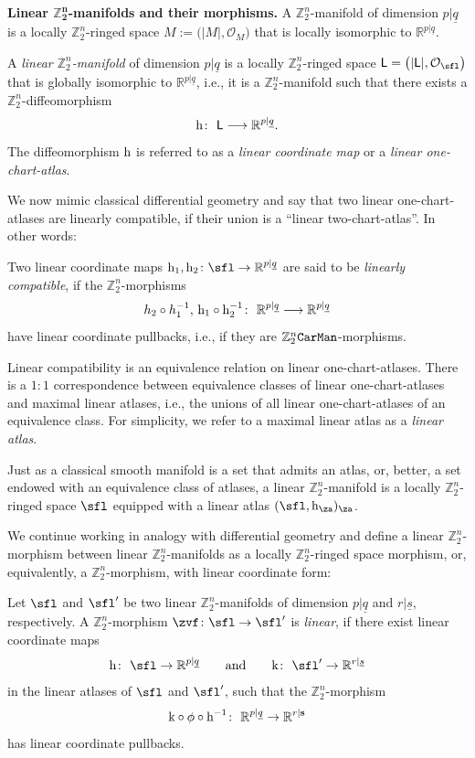 \documentclass[10pt,a4paper]{amsart}
\newcommand{\rmh}{\textnormal{h}}
\newcommand{\rmk}{\textnormal{k}}
\newcommand{\R}{{\mathbb R}}
\newcommand{\Z}{{\mathbb Z}}
\def\ul{\underline}
\def\cO{\mathcal{O}}
\def\ul{\underline}
\newcommand{\0}{\otimes}
\newcommand{\z}{\Z_2^n}
\numberwithin{equation}{section}
\begin{document}
\medskip\noindent
{\bf Linear $\boldsymbol{\z}$-manifolds and their morphisms.} A $\Z_2^n$-manifold of dimension $p|\ul q$ is a locally $\Z^n_2$-ringed space $M := \big(|M|, \cO_M\big)$ that is locally isomorphic to $\R^{p|\ul q}$.
%
\begin{Definition}%
A {\it linear $\Z_2^n$-manifold} of dimension $p|\ul q$ is a locally $\Z_2^n$-ringed space $\textsf{L}=\big(|\textsf{L}|,\cO_\sfl\big)$ that is globally isomorphic to $\R^{p|\ul{q}}$, i.e., it is a $\Z_2^n$-manifold such that there exists a $\Z_2^n$-diffeomorphism
%
\[
\rmh \colon\ \textsf{L} \longrightarrow \R^{p|\ul{q}}.
\]
%
The diffeomorphism $\rmh$ is referred to as a \emph{linear coordinate map} or a \emph{linear one-chart-atlas}.
\end{Definition}
%

We now mimic classical differential geometry and say that two linear one-chart-atlases are linearly compatible, if their union is a ``linear two-chart-atlas''. In other words:

\begin{Definition}
Two linear coordinate maps $\rmh_1, \rmh_2 \colon \sfl \rightarrow \R^{p|\ul{q}}$ are said to be \emph{linearly compa\-tible}, if the $\z$-morphisms
%
\[
h_2\circ h_1^{-1},\,\rmh_1 \circ \rmh^{-1}_2 \colon\ \R^{p|\ul{q}} \longrightarrow \R^{p|\ul{q}}
\]
%
have linear coordinate pullbacks, i.e., if they are $\z\tt CarMan$-morphisms.
\end{Definition}

Linear compatibility is an equivalence relation on linear one-chart-atlases. There is a \mbox{$1:1$} correspondence between equivalence classes of linear one-chart-atlases and maximal linear atla\-ses, i.e., the unions of all linear one-chart-atlases of an equivalence class. For simplicity, we refer to a maximal linear atlas as a \emph{linear atlas}.

Just as a classical smooth manifold is a set that admits an atlas, or, better, a set endowed with an equivalence class of atlases, a linear $\Z_2^n$-manifold is a locally $\z$-ringed space $\sfl$ equipped with a linear atlas $(\sfl,\rmh_\za)_\za$.

We continue working in analogy with differential geometry and define a linear $\Z_2^n$-morphism between linear $\z$-manifolds as a locally $\Z_2^n$-ringed space morphism, or, equivalently, a $\z$-morphism, with linear coordinate form:
\begin{Definition}\label{def:LinMorpTen}
Let $\sfl$ and $\sfl'$ be two linear $\z$-manifolds of dimension $p|\ul q$ and $r|\ul s$, respectively. A $\Z_2^n$-morphism $\zvf\colon \sfl\to \sfl'$ is {\it linear}, if there exist linear coordinate maps
\[
\rmh\colon\ \sfl\to\R^{p|\ul q}\qquad\text{and}\qquad\rmk\colon\ \sfl'\to\R^{r|\ul s}
\]
in the linear atlases of $\sfl$ and $\sfl'$, such that the $\z$-morphism
\[
\rmk \circ \phi \circ \rmh^{-1}\colon\ \mathbb{R}^{p|\ul{q}} \rightarrow \mathbb{R}^{r|\mathbf{s}}
\]
has linear coordinate pullbacks.
\end{Definition}
\end{document}
